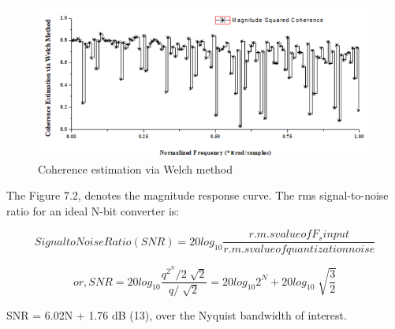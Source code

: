 \begin{enumerate}[label=\roman*]
\begin{figure}[H]
	\begin{Center}
		\includegraphics[width=6in,height=2in]{15}
		\caption{ Coherence estimation via Welch method }
		\label{fig:_1_Coherence_estimation_via_Welch_method_}
	\end{Center}
\end{figure}



\par

\setlength{\parskip}{8.04pt}
\par

\setlength{\parskip}{0.0pt}
The Figure 7.2, denotes the magnitude response curve. The rms signal-to-noise ratio for an ideal N-bit converter is:\par


\begin{equation}\tag{7.3}
Signal to Noise Ratio (SNR) = 20log_{10}\frac{r.m.s value of F_{s} input}{r.m.s value of quantization noise}
\end{equation}

\begin{equation}\tag{7.4}
or, SNR = 20log_{10}\frac{q^{2^{N}}/2\sqrt[]{2}}{q/\sqrt[]{2}}=20log_{10}2^{N}+20log_{10}\sqrt[]{\frac{3}{2}}
\end{equation}
\begin{justify}
SNR = 6.02N + 1.76 dB (13), over the Nyquist bandwidth of interest.
\end{justify}\par





\end{enumerate}

